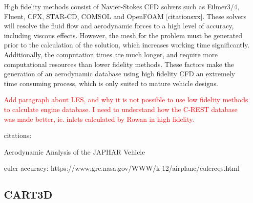 High fidelity methods consist of Navier-Stokes CFD solvers such as Eilmer3/4, Fluent, CFX, STAR-CD, COMSOL and OpenFOAM [citationsxx]. These solvers will resolve the fluid flow and aerodynamic forces to a high level of accuracy, including viscous effects. However, the mesh for the problem must be generated prior to the calculation of the solution, which increases working time significantly. Additionally, the computation times are much longer, and require more computational resources than lower fidelity methods. These factors make the generation of an aerodynamic database using high fidelity CFD an extremely time consuming process, which is only suited to mature vehicle designs. 


\textcolor{red}{Add paragraph about LES, and why it is not possible to use low fidelity methods to calculate engine database. I need to understand how the C-REST database was made better, ie. inlets calculated by Rowan in high fidelity.}

citations:

Aerodynamic 	Analysis	of the JAPHAR Vehicle 

euler accuracy: https://www.grc.nasa.gov/WWW/k-12/airplane/eulereqs.html

\subsection{CART3D}

